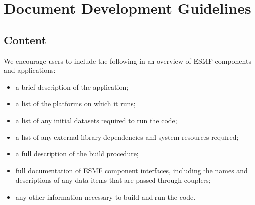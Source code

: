
\section{Document Development Guidelines}
\label{sec:appdocs}

\subsection{Content}

We encourage users to include the following in an overview
of ESMF components and applications:
\begin{itemize}
\item a brief description of the application;
\item a list of the platforms on which it runs;
\item a list of any initial datasets required to run the code;
\item a list of any external library dependencies and system 
      resources required;
\item a full description of the build procedure;
\item full documentation of ESMF component interfaces, including
      the names and descriptions of any data items that are passed
      through couplers;
\item any other information necessary to build and run the 
      code.
\end{itemize}





















